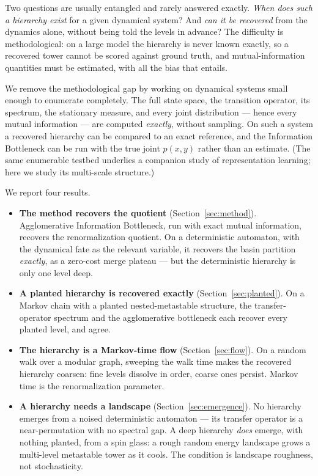 \documentclass[11pt]{article}
\begin{document}
Two questions are usually entangled and rarely answered exactly. \emph{When
does such a hierarchy exist} for a given dynamical system? And \emph{can it be
recovered} from the dynamics alone, without being told the levels in advance?
The difficulty is methodological: on a large model the hierarchy is never known
exactly, so a recovered tower cannot be scored against ground truth, and
mutual-information quantities must be estimated, with all the bias that entails.

We remove the methodological gap by working on dynamical systems small enough
to enumerate completely. The full state space, the transition operator, its
spectrum, the stationary measure, and every joint distribution --- hence every
mutual information --- are computed \emph{exactly}, without sampling. On such a
system a recovered hierarchy can be compared to an exact reference, and the
Information Bottleneck can be run with the true joint $p(x,y)$ rather than an
estimate. (The same enumerable testbed underlies a companion study of
representation learning; here we study its multi-scale structure.)

We report four results.
\begin{itemize}
  \item \textbf{The method recovers the quotient}
    (Section~\ref{sec:method}). Agglomerative Information Bottleneck, run with
    exact mutual information, recovers the renormalization quotient. On a
    deterministic automaton, with the dynamical fate as the relevant variable,
    it recovers the basin partition \emph{exactly}, as a zero-cost merge
    plateau --- but the deterministic hierarchy is only one level deep.
  \item \textbf{A planted hierarchy is recovered exactly}
    (Section~\ref{sec:planted}). On a Markov chain with a planted
    nested-metastable structure, the transfer-operator spectrum and the
    agglomerative bottleneck each recover every planted level, and agree.
  \item \textbf{The hierarchy is a Markov-time flow}
    (Section~\ref{sec:flow}). On a random walk over a modular graph, sweeping
    the walk time makes the recovered hierarchy coarsen: fine levels dissolve
    in order, coarse ones persist. Markov time is the renormalization
    parameter.
  \item \textbf{A hierarchy needs a landscape}
    (Section~\ref{sec:emergence}). No hierarchy emerges from a noised
    deterministic automaton --- its transfer operator is a near-permutation
    with no spectral gap. A deep hierarchy \emph{does} emerge, with nothing
    planted, from a spin glass: a rough random energy landscape grows a
    multi-level metastable tower as it cools. The condition is landscape
    roughness, not stochasticity.
\end{itemize}
\end{document}
